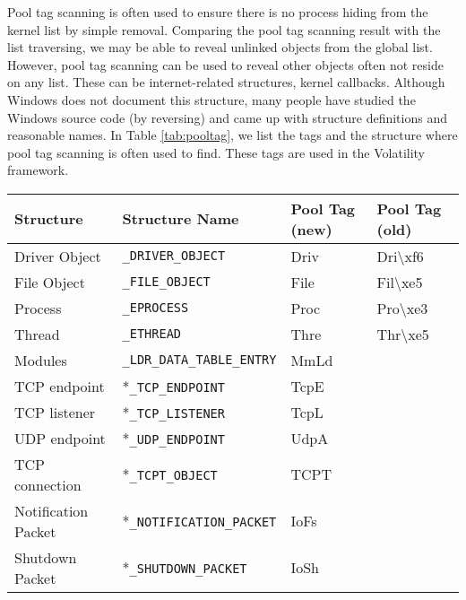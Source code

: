Pool tag scanning is often used to ensure there is no process hiding from the
kernel list by simple removal. Comparing the pool tag scanning result with the
list traversing, we may be able to reveal unlinked objects from the global
list. However, pool tag scanning can be used to reveal other objects often not
reside on any list. These can be internet-related structures, kernel callbacks.
Although Windows does not document this structure, many people have studied the
Windows source code (by reversing) and came up with structure definitions and
reasonable names. In Table \ref{tab:pooltag}, we list the tags and the
structure where pool tag scanning is often used to find. These tags are used in
the Volatility framework.

\begin{table}[]
\begin{tabular}{llll}
\hline
  Structure                 & Structure Name                     & Pool Tag (new) & Pool Tag (old)        \\ \hline
  Driver Object             & \texttt{\_DRIVER\_OBJECT}          & Driv           & Dri\textbackslash xf6 \\
  File Object               & \texttt{\_FILE\_OBJECT}            & File           & Fil\textbackslash xe5 \\
  Process                   & \texttt{\_EPROCESS}                & Proc           & Pro\textbackslash xe3 \\
  Thread                    & \texttt{\_ETHREAD}                 & Thre           & Thr\textbackslash xe5 \\
  Modules                   & \texttt{\_LDR\_DATA\_TABLE\_ENTRY} & MmLd           &                       \\
  TCP endpoint              & *\texttt{\_TCP\_ENDPOINT}          & TcpE           &                       \\
  TCP listener              & *\texttt{\_TCP\_LISTENER}          & TcpL           &                       \\
  UDP endpoint              & *\texttt{\_UDP\_ENDPOINT}          & UdpA           &                       \\
  TCP connection            & *\texttt{\_TCPT\_OBJECT}           & TCPT           &                       \\
  Notification Packet       & *\texttt{\_NOTIFICATION\_PACKET}   & IoFs           &                       \\
  Shutdown Packet           & *\texttt{\_SHUTDOWN\_PACKET}       & IoSh           &                       \\

\end{tabular}
\end{table}
